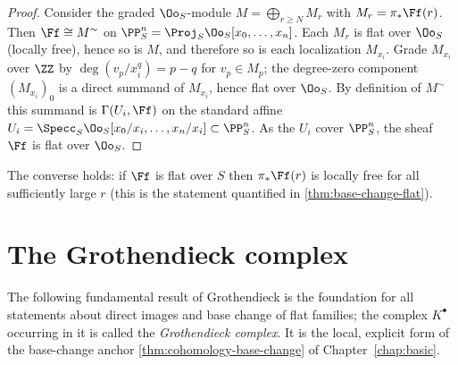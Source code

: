 \begin{proof}
  Consider the graded $\Oo_S$-module $M=\bigoplus_{r\ge N}M_r$ with
  $M_r=\pi_*\Ff(r)$. Then $\Ff\cong M^\sim$ on
  $\PP^n_S=\Proj_S\Oo_S[x_0,\dots,x_n]$. Each $M_r$ is flat over $\Oo_S$ (locally
  free), hence so is $M$, and therefore so is each localization $M_{x_i}$. Grade
  $M_{x_i}$ over $\ZZ$ by $\deg(v_p/x_i^q)=p-q$ for $v_p\in M_p$; the degree-zero
  component $(M_{x_i})_0$ is a direct summand of $M_{x_i}$, hence flat over
  $\Oo_S$. By definition of $M^\sim$ this summand is $\Gamma(U_i,\Ff)$ on the
  standard affine $U_i=\Specc_S\Oo_S[x_0/x_i,\dots,x_n/x_i]\subset\PP^n_S$. As
  the $U_i$ cover $\PP^n_S$, the sheaf $\Ff$ is flat over $\Oo_S$.
\end{proof}

\begin{remark}
  The converse holds: if $\Ff$ is flat over $S$ then $\pi_*\Ff(r)$ is locally
  free for all sufficiently large $r$ (this is the statement quantified in
  \cref{thm:base-change-flat}).
\end{remark}

\section{The Grothendieck complex}

The following fundamental result of Grothendieck is the foundation for all
statements about direct images and base change of flat families; the complex
$K^\bullet$ occurring in it is called the \emph{Grothendieck complex}. It is the
local, explicit form of the base-change anchor \cref{thm:cohomology-base-change}
of Chapter~\ref{chap:basic}.

